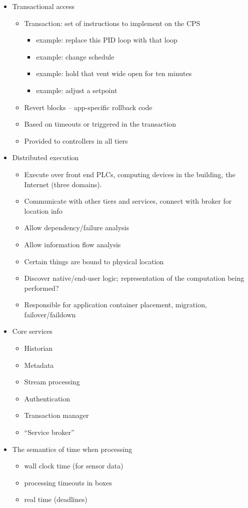 \documentclass[10pt,twocolumn,letterpaper]{article}
\begin{document}
\begin{itemize}
\item Transactional access
  \begin{itemize}
    \item Transaction: set of instructions to implement on the CPS
    \begin{itemize}
      \item example: replace this PID loop with that loop
      \item example: change schedule
      \item example: hold that vent wide open for ten minutes
      \item example: adjust a setpoint
    \end{itemize}
    \item Revert blocks -- app-specific rollback code
    \item Based on timeouts or triggered in the transaction
    \item Provided to controllers in all tiers
  \end{itemize}
  
\item Distributed execution
  \begin{itemize}
    \item Execute over front end PLCs, computing devices in the building, the Internet (three domains).
    \item Communicate with other tiers and services, connect with broker for location info
    \item Allow dependency/failure analysis
    \item Allow information flow analysis
    \item Certain things are bound to physical location
    \item Discover native/end-user logic; representation of the computation being performed?
    \item Responsible for application container placement, migration, failover/faildown
  \end{itemize}

\item Core services
  \begin{itemize}
    \item Historian
    \item Metadata
    \item Stream processing
    \item Authentication
    \item Transaction manager
    \item ``Service broker''
   \end{itemize}
   
\item The semantics of time when processing
  \begin{itemize}
    \item wall clock time (for sensor data)
    \item processing timeouts in boxes
    \item real time (deadlines)
   \end{itemize}
\end{itemize}
\end{document}
